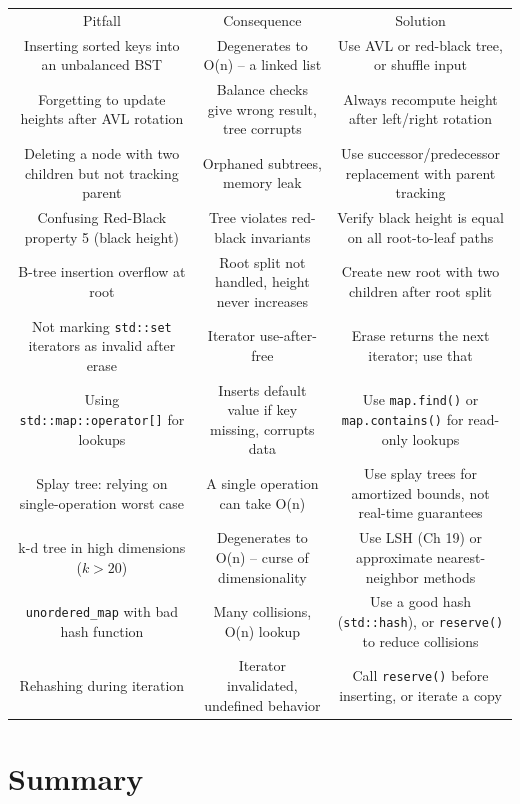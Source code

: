 \begin{center}
\begin{tabular}{ccc}
\toprule
Pitfall & Consequence & Solution \\
Inserting sorted keys into an unbalanced BST & Degenerates to O(n) -- a linked list & Use AVL or red-black tree, or shuffle input \\
Forgetting to update heights after AVL rotation & Balance checks give wrong result, tree corrupts & Always recompute height after left/right rotation \\
Deleting a node with two children but not tracking parent & Orphaned subtrees, memory leak & Use successor/predecessor replacement with parent tracking \\
Confusing Red-Black property 5 (black height) & Tree violates red-black invariants & Verify black height is equal on all root-to-leaf paths \\
B-tree insertion overflow at root & Root split not handled, height never increases & Create new root with two children after root split \\
Not marking \texttt{std::set} iterators as invalid after erase & Iterator use-after-free & Erase returns the next iterator; use that \\
Using \texttt{std::map::operator[]} for lookups & Inserts default value if key missing, corrupts data & Use \texttt{map.find()} or \texttt{map.contains()} for read-only lookups \\
Splay tree: relying on single-operation worst case & A single operation can take O(n) & Use splay trees for amortized bounds, not real-time guarantees \\
k-d tree in high dimensions ($k > 20$) & Degenerates to O(n) -- curse of dimensionality & Use LSH (Ch 19) or approximate nearest-neighbor methods \\
\texttt{unordered\_map} with bad hash function & Many collisions, O(n) lookup & Use a good hash (\texttt{std::hash}), or \texttt{reserve()} to reduce collisions \\
Rehashing during iteration & Iterator invalidated, undefined behavior & Call \texttt{reserve()} before inserting, or iterate a copy \\
\bottomrule
\end{tabular}
\end{center}
\section{Summary}

